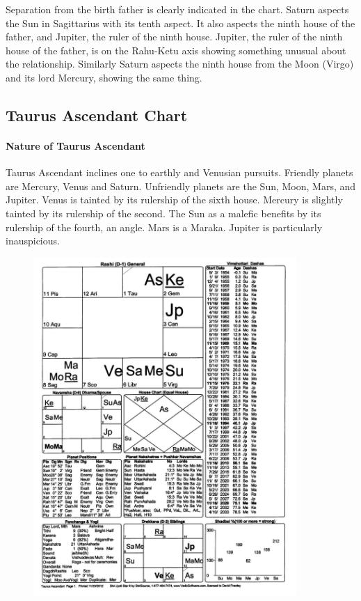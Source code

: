  

Separation from the birth father is clearly indicated in the chart. Saturn aspects the Sun in Sagittarius with its tenth aspect. It also aspects the ninth house of the father, and Jupiter, the ruler of the ninth house. Jupiter, the ruler of the ninth house of the father, is on the Rahu-Ketu axis showing something unusual about the relationship. Similarly Saturn aspects the ninth house from the Moon (Virgo) and its lord Mercury, showing the same thing.

 

\subsection{Taurus Ascendant Chart}
 

\paragraph{Nature of Taurus Ascendant}

 

Taurus Ascendant inclines one to earthly and Venusian pursuits. Friendly planets are Mercury, Venus and Saturn. Unfriendly planets are the Sun, Moon, Mars, and Jupiter. Venus is tainted by its rulership of the sixth house. Mercury is slightly tainted by its rulership of the second. The Sun as a malefic benefits by its rulership of the fourth, an angle. Mars is a Maraka. Jupiter is particularly inauspicious.

 
\begin{figure}[h]
\centering
\includegraphics[width=10cm]{pics/Taurus-Ascendant.jpg}
\caption{}
\end{figure}



